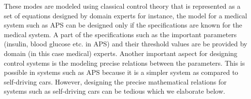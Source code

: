These modes are modeled using classical control theory that is represented as a set of equations designed by domain experts
 for instance, the model for a medical system such as \ac{APS} can be designed only if the specifications are known for the medical system. 
 A part of the specifications such as the important parameters (insulin, blood glucose etc. in APS) and their threshold values are be provided by domain (in this case medical) experts. 
 Another important aspect for designing control systems is the  modeling precise relations between the parameters. 
 This is possible in systems such as APS because it is a simpler system as compared to self-driving cars. 
 However, designing the precise mathematical relations for systems such as self-driving cars can be tedious \cite{article23} which we elaborate below.

